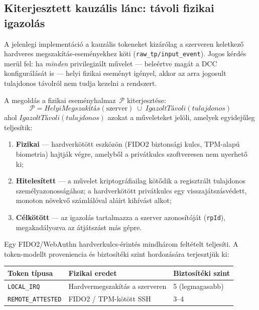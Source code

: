 \documentclass[11pt,a4paper,twoside]{article}
\begin{document}
\subsection{Kiterjesztett kauzális lánc: távoli fizikai igazolás}
\label{sec:tavoli-igazolas}

A jelenlegi implementáció a kauzális tokeneket kizárólag a szerveren keletkező
hardveres megszakítás-eseményekhez köti (\texttt{raw\_tp/input\_event}).
Jogos kérdés merül fel: ha \emph{minden} privilegizált művelet — beleértve
magát a DCC konfigurálását is — helyi fizikai eseményt igényel, akkor az
arra jogosult tulajdonos távolról nem tudja kezelni a rendszert.

A megoldás a fizikai eseményhalmaz~$\mathcal{P}$ kiterjesztése:
\[
  \mathcal{P} = \mathit{HelyiMegszakítás}(\text{szerver})
             \;\cup\;
             \mathit{IgazoltTávoli}(\mathit{tulajdonos})
\]
ahol $\mathit{IgazoltTávoli}(\mathit{tulajdonos})$ azokat a műveleteket
jelöli, amelyek egyidejűleg teljesítik:
\begin{enumerate}[topsep=2pt,itemsep=1pt]
  \item \textbf{Fizikai} — hardverkötött eszközön (FIDO2 biztonsági kulcs,
        TPM-alapú biometria) hajtják végre, amelyből a privátkulcs szoftveresen
        nem nyerhető ki;
  \item \textbf{Hitelesített} — a művelet kriptográfiailag kötődik a regisztrált
        tulajdonos személyazonosságához; a hardverkötött privátkulcs egy
        visszajátszásvédett, monoton növekvő számlálóval aláírt kihívást alkot;
  \item \textbf{Célkötött} — az igazolás tartalmazza a szerver azonosítóját
        (\texttt{rpId}), megakadályozva az átjátszást más gépre.
\end{enumerate}

Egy FIDO2/WebAuthn hardverkulcs-érintés mindhárom feltételt teljesíti.
A token-modellt proveniencia és biztosítéki szint hordozására terjesztjük ki:

\begin{center}\small
\begin{tabular}{@{}lll@{}}
\toprule
\textbf{Token típusa} & \textbf{Fizikai eredet} & \textbf{Biztosítéki szint} \\ \midrule
\texttt{LOCAL\_IRQ}       & Hardvermegszakítás a szerveren & 5 (legmagasabb) \\
\texttt{REMOTE\_ATTESTED} & FIDO2 / TPM-kötött SSH         & 3--4 \\
\bottomrule
\end{tabular}
\end{center}
\end{document}
